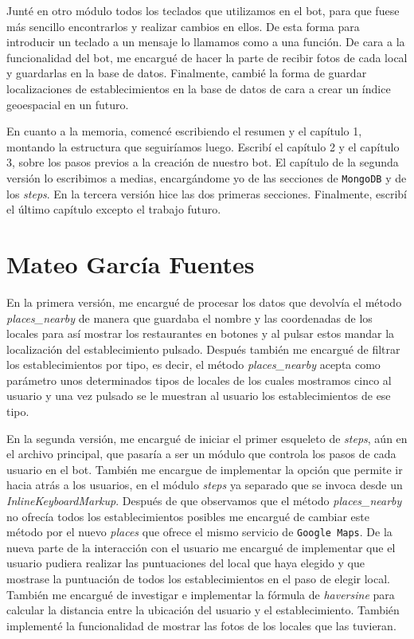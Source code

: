 \documentclass[oneside]{memoir}
\begin{document}
Junté en otro módulo todos los teclados que utilizamos en el bot, para que fuese más sencillo encontrarlos y realizar cambios en ellos. De esta forma para introducir un teclado a un mensaje lo llamamos como a una función. De cara a la funcionalidad del bot, me encargué de hacer la parte de recibir fotos de cada local y guardarlas en la base de datos. Finalmente, cambié la forma de guardar localizaciones de establecimientos en la base de datos de cara a crear un índice geoespacial en un futuro.

En cuanto a la memoria, comencé escribiendo el resumen y el capítulo 1, montando la estructura que seguiríamos luego. Escribí el capítulo 2 y el capítulo 3, sobre los pasos previos a la creación de nuestro bot. El capítulo de la segunda versión lo escribimos a medias, encargándome yo de las secciones de \texttt{MongoDB} y de los \textit{steps}. En la tercera versión hice las dos primeras secciones. Finalmente, escribí el último capítulo excepto el trabajo futuro. 

\section{Mateo Garc\'ia Fuentes}
En la primera versión, me encargué de procesar los datos que devolvía el método \textit{places\_nearby} de manera que guardaba el nombre y las coordenadas de los locales para así mostrar los restaurantes en botones y al pulsar estos mandar la localización del establecimiento pulsado. Después también me encargué de filtrar los establecimientos por tipo, es decir, el método \textit{places\_nearby} acepta como parámetro unos determinados tipos de locales de los cuales mostramos cinco al usuario y una vez pulsado se le muestran al usuario los establecimientos de ese tipo. 

En la segunda versión, me encargué de iniciar el primer esqueleto de \textit{steps}, aún en el archivo principal, que pasaría a ser un módulo que controla los pasos de cada usuario en el bot. También me encargue de implementar la opción que permite ir hacia atrás a los usuarios, en el módulo \textit{steps} ya separado que se invoca desde un \textit{InlineKeyboardMarkup}. Después de que observamos que el  método \textit{places\_nearby} no ofrecía todos los establecimientos posibles me encargué de cambiar este método por el nuevo \textit{places} que ofrece el mismo servicio de \texttt{Google Maps}. De la nueva parte de la interacción con el usuario me encargué de implementar que el usuario pudiera realizar las puntuaciones del local que haya elegido y que mostrase la puntuación de todos los establecimientos en el paso de elegir local. También me encargué de investigar e implementar la fórmula de \textit{haversine} para calcular la distancia entre la ubicación del usuario y el establecimiento. También implementé  la funcionalidad de mostrar las fotos de los locales que las tuvieran.
\end{document}
